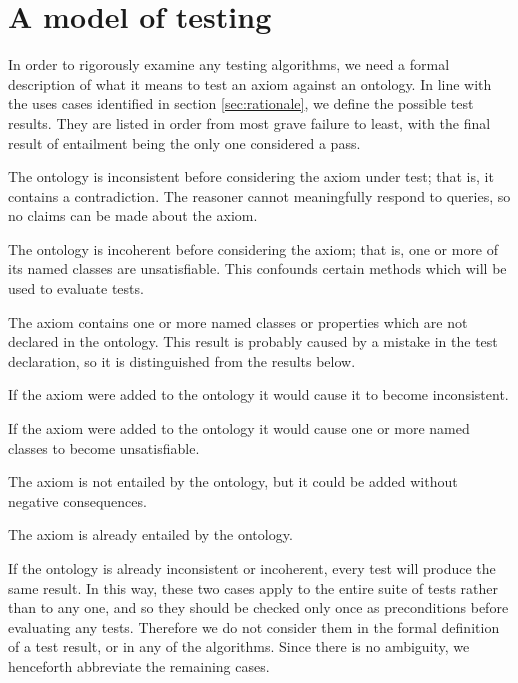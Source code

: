 \documentclass[paper.tex]{subfiles}
\begin{document}
\section{A model of testing}
\label{sec:model}

In order to rigorously examine any testing algorithms, we need a formal description of what it means to test an axiom against an ontology.
In line with the uses cases identified in section \ref{sec:rationale}, we define the possible test results.
They are listed in order from most grave failure to least, with the final result of entailment being the only one considered a pass.
\begin{description}[
  before={\renewcommand\makelabel[1]{\normalfont\itshape##1:}},
  labelindent=1em,
  leftmargin=2em,
  nosep,
]
  \item[Ontology already inconsistent]  The ontology is inconsistent before considering the axiom under test; that is, it contains a contradiction.  The reasoner cannot meaningfully respond to queries, so no claims can be made about the axiom.
  \item[Ontology already incoherent]  The ontology is incoherent before considering the axiom; that is, one or more of its named classes are unsatisfiable.  This confounds certain methods which will be used to evaluate tests.
  \item[Missing entity in axiom]  The axiom contains one or more named classes or properties which are not declared in the ontology.  This result is probably caused by a mistake in the test declaration, so it is distinguished from the results below.
  \item[Axiom causes inconsistency]  If the axiom were added to the ontology it would cause it to become inconsistent.
  \item[Axiom causes incoherence]  If the axiom were added to the ontology it would cause one or more named classes to become unsatisfiable.
  \item[Axiom absent]  The axiom is not entailed by the ontology, but it could be added without negative consequences.
  \item[Axiom entailed]  The axiom is already entailed by the ontology.
\end{description}


If the ontology is already inconsistent or incoherent, every test will produce the same result.  In this way, these two cases apply to the entire suite of tests rather than to any one, and so they should be checked only once as preconditions before evaluating any tests.  Therefore we do not consider them in the formal definition of a test result, or in any of the algorithms.  Since there is no ambiguity, we henceforth abbreviate the remaining cases.  \todo[how?]
\end{document}
